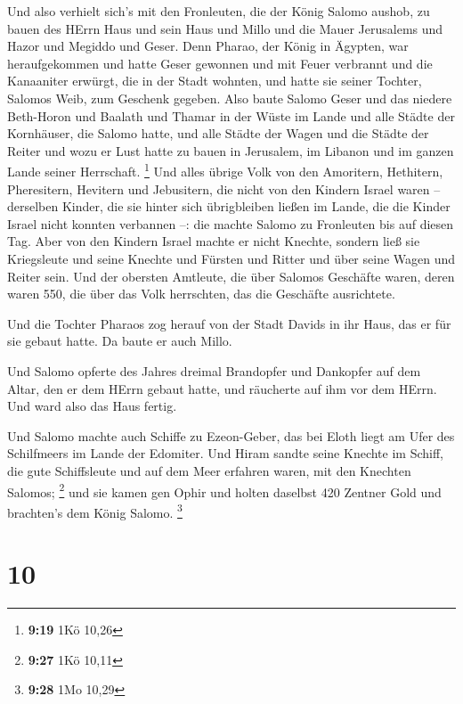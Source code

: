  Und also verhielt sich's mit den Fronleuten, die der König
Salomo aushob, zu bauen des HErrn Haus und sein Haus und Millo und die
Mauer Jerusalems und Hazor und Megiddo und Geser.  Denn
Pharao, der König in Ägypten, war heraufgekommen und hatte Geser
gewonnen und mit Feuer verbrannt und die Kanaaniter erwürgt, die in der
Stadt wohnten, und hatte sie seiner Tochter, Salomos Weib, zum Geschenk
gegeben.  Also baute Salomo Geser und das niedere
Beth-Horon  und Baalath und Thamar in der Wüste im Lande
 und alle Städte der Kornhäuser, die Salomo hatte, und alle
Städte der Wagen und die Städte der Reiter und wozu er Lust hatte zu
bauen in Jerusalem, im Libanon und im ganzen Lande seiner Herrschaft.
\footnote{\textbf{9:19} 1Kö 10,26}  Und alles übrige Volk
von den Amoritern, Hethitern, Pheresitern, Hevitern und Jebusitern, die
nicht von den Kindern Israel waren --  derselben Kinder,
die sie hinter sich übrigbleiben ließen im Lande, die die Kinder Israel
nicht konnten verbannen --: die machte Salomo zu Fronleuten bis auf
diesen Tag.  Aber von den Kindern Israel machte er nicht
Knechte, sondern ließ sie Kriegsleute und seine Knechte und Fürsten und
Ritter und über seine Wagen und Reiter sein.  Und der
obersten Amtleute, die über Salomos Geschäfte waren, deren waren 550,
die über das Volk herrschten, das die Geschäfte ausrichtete.

 Und die Tochter Pharaos zog herauf von der Stadt Davids in
ihr Haus, das er für sie gebaut hatte. Da baute er auch Millo.

 Und Salomo opferte des Jahres dreimal Brandopfer und
Dankopfer auf dem Altar, den er dem HErrn gebaut hatte, und räucherte
auf ihm vor dem HErrn. Und ward also das Haus fertig.

 Und Salomo machte auch Schiffe zu Ezeon-Geber, das bei
Eloth liegt am Ufer des Schilfmeers im Lande der Edomiter. 
Und Hiram sandte seine Knechte im Schiff, die gute Schiffsleute und auf
dem Meer erfahren waren, mit den Knechten Salomos; \footnote{\textbf{9:27}
  1Kö 10,11}  und sie kamen gen Ophir und holten daselbst
420 Zentner Gold und brachten's dem König Salomo. \footnote{\textbf{9:28}
  1Mo 10,29}

\hypertarget{section-2}{%
\section{10}\label{section-2}}

